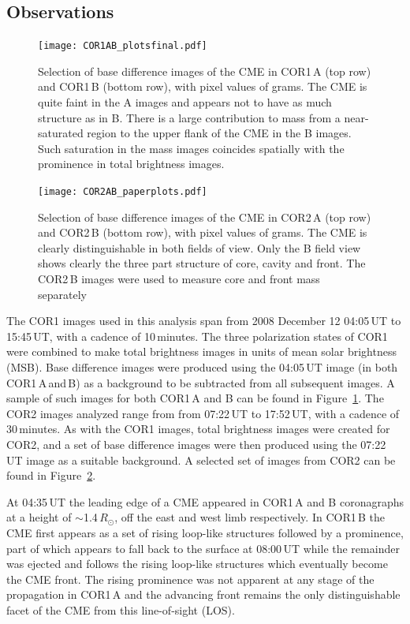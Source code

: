 \subsection{Observations}

\begin{figure}[h!]
\texttt{[image: COR1AB\_plotsfinal.pdf]}
\caption {Selection of base difference images of the CME in COR1\,A (top row) and COR1\,B (bottom row),  with pixel values of grams. The CME is 
quite faint in the A images and appears not to have as much structure as in B. There is a large contribution to mass from a near-saturated region to 
the upper flank of the CME in the B images. Such saturation in the mass images coincides spatially with the prominence in total brightness images.}
\label{fig:STEREO_COR1A&B}
\end{figure}

\begin{figure}[h!]
\texttt{[image: COR2AB\_paperplots.pdf]}
\caption {Selection of base difference images of the CME in COR2\,A (top row) and COR2\,B (bottom row), with pixel values of grams. The CME is 
clearly distinguishable in both fields of view. Only the B field view shows clearly the three part structure of core, cavity and front. The COR2\,B 
images were used to measure core and front mass separately}
\label{fig:STEREO_COR2A&B}
\end{figure}

The COR1 images used in this analysis span from 2008 December 12 04:05\,UT to 15:45\,UT, with a cadence of 10\,minutes. The three 
polarization states of COR1 were combined to make total brightness images in units of mean solar brightness (MSB). 
Base difference images were produced using the 04:05\,UT image (in both COR1\,A\,and\,B) as a background to be subtracted from all subsequent 
images. A sample of such images for both COR1\,A and B can be found in Figure~\ref{fig:STEREO_COR1A&B}. The COR2 images analyzed 
range from from 07:22\,UT to 17:52\,UT, with a cadence of 30\,minutes. As with the COR1 images, total brightness images were created for COR2, 
and a set of base difference images were then produced using the 07:22\,UT image as a suitable background. A selected set of images from COR2 
can be found in Figure~\ref{fig:STEREO_COR2A&B}. 
	
At 04:35\,UT the leading edge of a CME appeared in COR1\,A and B coronagraphs at a height of $\sim$1.4\,$R_{\odot}$, off the east and west 
limb respectively. In COR1\,B the CME first appears as a set of rising loop-like structures followed by a prominence, part of which appears to fall 
back to the surface at 08:00\,UT while the remainder was ejected and follows the rising loop-like structures which eventually become the CME front. 
The rising prominence was not apparent at any stage of the propagation in COR1\,A and the advancing front remains the only distinguishable facet 
of the CME from this line-of-sight (LOS).
		
